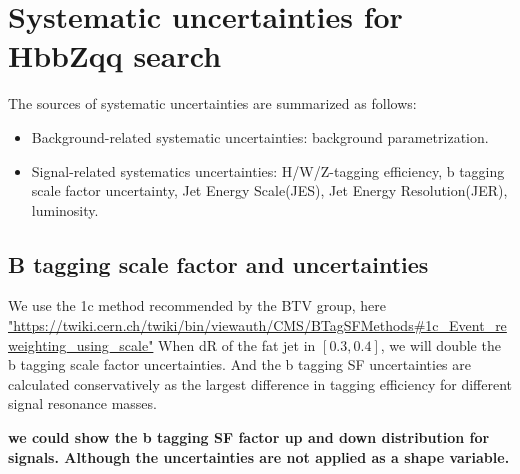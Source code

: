 \section{Systematic uncertainties for HbbZqq search}
\label{sec:systematics}
The sources of systematic uncertainties are summarized as
follows:
\begin{itemize}
\item Background-related systematic uncertainties: background parametrization.
\item Signal-related systematics uncertainties: H/W/Z-tagging efficiency, b tagging scale factor uncertainty, Jet Energy Scale(JES), Jet Energy Resolution(JER), luminosity.
\end{itemize}





\subsection{ B tagging scale factor and uncertainties}
We use the 1c method recommended by the BTV group,
here \hyperref[bSF]{"https://twiki.cern.ch/twiki/bin/viewauth/CMS/BTagSFMethods\#1c\_Event\_reweighting\_using\_scale"}
When dR of the fat jet in $[0.3, 0.4]$, we will double the b tagging scale factor uncertainties. 
And the b tagging SF uncertainties are calculated conservatively as the largest difference in tagging efficiency 
for different signal resonance masses. 

{\bf we could show the b tagging SF factor up and down distribution for signals. Although the uncertainties are not 
applied as a shape variable.}










\clearpage
